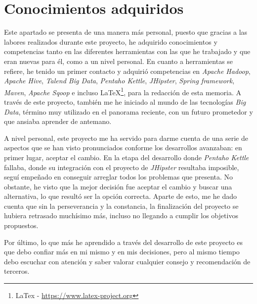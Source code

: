 \section{Conocimientos adquiridos} \label{conclusiones.conocimientos}
Este apartado se presenta de una manera más personal, puesto que gracias a las labores realizados durante este proyecto, he adquirido conocimientos y competencias tanto en las diferentes herramientas con las que he trabajado y que eran nuevas para él, como a un nivel personal. En cuanto a herramientas se refiere, he tenido un primer contacto y adquirió competencias en \textit{Apache Hadoop}, \textit{Apache Hive}, \textit{Talend Big Data}, \textit{Pentaho Kettle}, \textit{JHipster}, \textit{Spring framework}, \textit{Maven}, \textit{Apache Sqoop} e incluso \LaTeX \footnote{LaTex - \url{https://www.latex-project.org}}, para la redacción de esta memoria. A través de este proyecto, también me he iniciado al mundo de las tecnologías \textit{Big Data}, término muy utilizado en el panorama reciente,  con un futuro prometedor y que ansiaba aprender de antemano. 
\par 
A nivel personal, este proyecto me ha servido para darme cuenta de una serie de aspectos que se han visto pronunciados conforme los desarrollos avanzaban: en primer lugar, aceptar el cambio. En la etapa del desarrollo donde \textit{Pentaho Kettle} fallaba, donde su integración con el proyecto de \textit{JHipster} resultaba imposible, seguí empeñado en conseguir arreglar todos los problemas que presenta. No obstante, he visto que la mejor decisión fue aceptar el cambio y buscar una alternativa, lo que resultó ser la opción correcta. Aparte de esto, me he dado cuenta que sin la perseverancia y la constancia, la finalización del proyecto se hubiera retrasado muchísimo más, incluso no llegando a cumplir los objetivos propuestos. 
\par Por último, lo que más he aprendido a través del desarrollo de este proyecto es que debo confiar más en mi mismo y en mis decisiones, pero al mismo tiempo debo escuchar con atención y saber valorar cualquier consejo y recomendación de terceros. 

 
